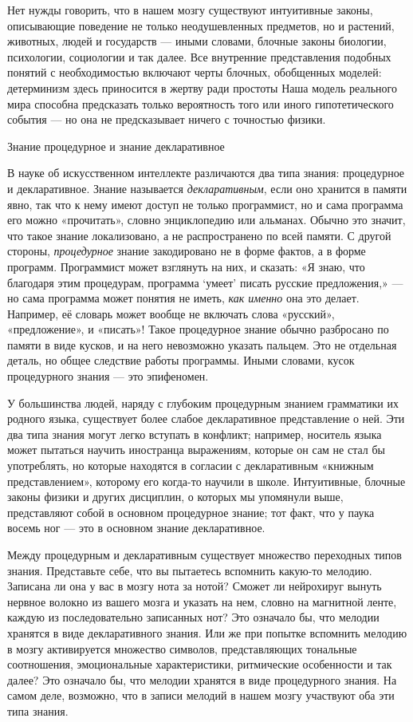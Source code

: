 \documentclass[../main.tex]{subfiles}
\begin{document}
Нет нужды говорить, что в нашем мозгу существуют интуитивные законы, описывающие поведение не только неодушевленных предметов, но и растений, животных, людей и государств --- иными словами, блочные законы биологии, психологии, социологии и так далее. Все внутренние представления подобных понятий с необходимостью включают черты блочных, обобщенных моделей: детерминизм здесь приносится в жертву ради простоты Наша модель реального мира способна предсказать только вероятность того или иного гипотетического события --- но она не предсказывает ничего с точностью физики.

Знание процедурное и знание декларативное

В науке об искусственном интеллекте различаются два типа знания: процедурное и декларативное. Знание называется \emph{декларативным}, если оно хранится в памяти явно, так что к нему имеют доступ не только программист, но и сама программа его можно «прочитать», словно энциклопедию или альманах. Обычно это значит, что такое знание локализовано, а не распространено по всей памяти. С другой стороны, \emph{процедурное} знание закодировано не в форме фактов, а в форме программ. Программист может взглянуть на них, и сказать: «Я знаю, что благодаря этим процедурам, программа \enquote*{умеет} писать русские предложения,» --- но сама программа может понятия не иметь, \emph{как именно} она это делает. Например, её словарь может вообще не включать слова «русский», «предложение», и «писать»! Такое процедурное знание обычно разбросано по памяти в виде кусков, и на него невозможно указать пальцем. Это не отдельная деталь, но общее следствие работы программы. Иными словами, кусок процедурного знания --- это эпифеномен.

У большинства людей, наряду с глубоким процедурным знанием грамматики их родного языка, существует более слабое декларативное представление о ней. Эти два типа знания могут легко вступать в конфликт; например, носитель языка может пытаться научить иностранца выражениям, которые он сам не стал бы употреблять, но которые находятся в согласии с декларативным «книжным представлением», которому его когда-то научили в школе. Интуитивные, блочные законы физики и других дисциплин, о которых мы упомянули выше, представляют собой в основном процедурное знание; тот факт, что у паука восемь ног --- это в основном знание декларативное.

Между процедурным и декларативным существует множество переходных типов знания. Представьте себе, что вы пытаетесь вспомнить какую-то мелодию. Записана ли она у вас в мозгу нота за нотой? Сможет ли нейрохируг вынуть нервное волокно из вашего мозга и указать на нем, словно на магнитной ленте, каждую из последовательно записанных нот? Это означало бы, что мелодии хранятся в виде декларативного знания. Или же при попытке вспомнить мелодию в мозгу активируется множество символов, представляющих тональные соотношения, эмоциональные характеристики, ритмические особенности и так далее? Это означало бы, что мелодии хранятся в виде процедурного знания. На самом деле, возможно, что в записи мелодий в нашем мозгу участвуют оба эти типа знания.
\end{document}
